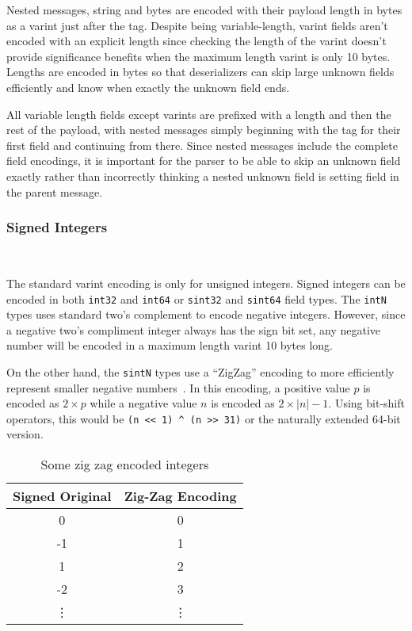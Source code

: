 \documentclass[11pt]{article}
\theoremstyle{definition}
\theoremstyle{plain}
\begin{document}
Nested messages, string and bytes are encoded with their payload length in bytes
as a varint just after the tag. Despite being variable-length, varint fields
aren't encoded with an explicit length since checking the length of the varint
doesn't provide significance benefits when the maximum length varint is only 10
bytes. Lengths are encoded in bytes so that deserializers can skip large unknown
fields efficiently and know when exactly the unknown field ends.

All variable length fields except varints are prefixed with a length and then
the rest of the payload, with nested messages simply beginning with the tag for
their first field and continuing from there. Since nested messages include the
complete field encodings, it is important for the parser to be able to skip an
unknown field exactly rather than incorrectly thinking a nested unknown field is
setting field in the parent message.

\subsubsection{Signed Integers}~\label{sec:proto-sint}

The standard varint encoding is only for unsigned integers. Signed integers can
be encoded in both \texttt{int32} and \texttt{int64} or \texttt{sint32} and
\texttt{sint64} field types. The \texttt{intN} types uses standard two's
complement to encode negative integers. However, since a negative two's
compliment integer always has the sign bit set, any negative number will be
encoded in a maximum length varint 10 bytes long.

On the other hand, the \texttt{sintN} types use a ``ZigZag'' encoding to more
efficiently represent smaller negative numbers~\cite{Encoding}. In this
encoding, a positive value $p$ is encoded as $2 \times p$ while a negative value $n$
is encoded as $2 \times |n| - 1$. Using bit-shift operators, this would be
\verb|(n << 1) ^ (n >> 31)| or the naturally extended 64-bit version.

\begin{table}[htbp]
  \centering
  \begin{tabular}{cc}
    \toprule
    Signed Original & Zig-Zag Encoding \\
    \midrule
    0 & 0 \\
    -1 & 1 \\
    1 & 2 \\
    -2 & 3 \\
    \vdots & \vdots \\
    \bottomrule
  \end{tabular}
\caption{Some zig zag encoded integers}
\label{tab:zigzag}
\end{table}
\end{document}
